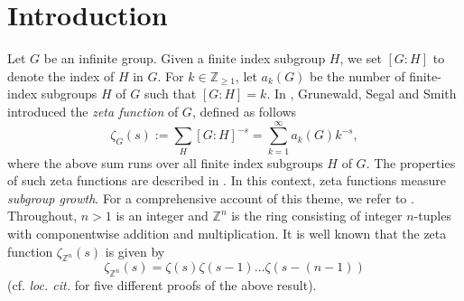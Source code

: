 \documentclass[a4paper]{amsart}
\numberwithin{equation}{section}
\theoremstyle{remark}
\newcommand{\Z}{\mathbb{Z}}
\begin{document}
\maketitle


 
\section{Introduction}\label{s 1}
\par Let $G$ be an infinite group. Given a finite index subgroup $H$, we set $[G:H]$ to denote the index of $H$ in $G$. For $k\in \Z_{\geq 1}$, let $a_k(G)$ be the number of finite-index subgroups $H$ of $G$ such that $[G:H]=k$. In \cite{grunewald1988subgroups}, Grunewald, Segal and Smith introduced the \emph{zeta function} of $G$, defined as follows
\[\zeta_G(s):=\sum_{H} [G:H]^{-s}=\sum_{k=1}^\infty a_k(G)k^{-s},\]
where the above sum runs over all finite index subgroups $H$ of $G$. The properties of such zeta functions are described in \cite{du2008zeta}. In this context, zeta functions measure \emph{subgroup growth}. For a comprehensive account of this theme, we refer to \cite{lubotzky2003subgroup}. Throughout, $n>1$ is an integer and $\Z^n$ is the ring consisting of integer $n$-tuples with componentwise addition and multiplication. It is well known that the zeta function $\zeta_{\Z^n}(s)$ is given by 
\[\zeta_{\Z^n} (s)=\zeta(s)\zeta(s-1)\dots \zeta(s-(n-1)) \] (cf. \emph{loc. cit.} for five different proofs of the above result). 
\end{document}
